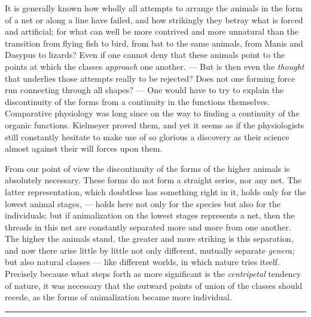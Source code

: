 \documentclass[12pt,a4paper,openany]{book}
\newcommand{\opage}[1]{\marginnote{\footnotesize\textit{[#1]}}}
\newcommand{\sectionrule}{\par\begin{center}\rule{4em}{0.4pt}\end{center}}
\begin{document}
It is generally known how wholly all attempts to arrange the animals in the form of
a net or along a line have failed, and how strikingly they betray what is forced and
artificial; for what can well be more contrived and more unnatural than the
transition from flying fish to bird, from bat to the same animals, from Manis and
Dasypus to lizards? Even if one cannot deny that these animals point to the points
at which the classes \textit{approach} one another. --- But is then even the
\textit{thought} that underlies those attempts really to be rejected? Does not one
forming force run connecting through all shapes? --- One would have to try to
explain the discontinuity of the forms from a continuity in the functions
themselves. Comparative physiology was long since on the way to finding a continuity
of the organic functions.
\setcounter{footnote}{0}%
\opage{50}Kielmeyer proved them, and yet it seems as if the physiologists still constantly
hesitate to make use of so glorious a discovery as their science almost against
their will forces upon them.

From our point of view the discontinuity of the forms of the higher animals is
absolutely necessary. These forms do not form a straight series, nor any net. The
latter representation, which doubtless has something right in it, holds only for
the lowest animal stages, --- holds here not only for the species but also for the
individuals; but if animalization on the lowest stages represents a net, then the
threads in this net are constantly separated more and more from one another. The
higher the animals stand, the greater and more striking is this separation, and now
there arise little by little not only different, mutually separate
\textit{genera;} but also natural classes --- like different worlds, in which nature
tries itself. Precisely because what steps forth as more significant is the
\textit{centripetal} tendency of nature, it was necessary that the outward points of
union of the classes should recede, as the forms of animalization became more
individual.

\sectionrule
\end{document}
